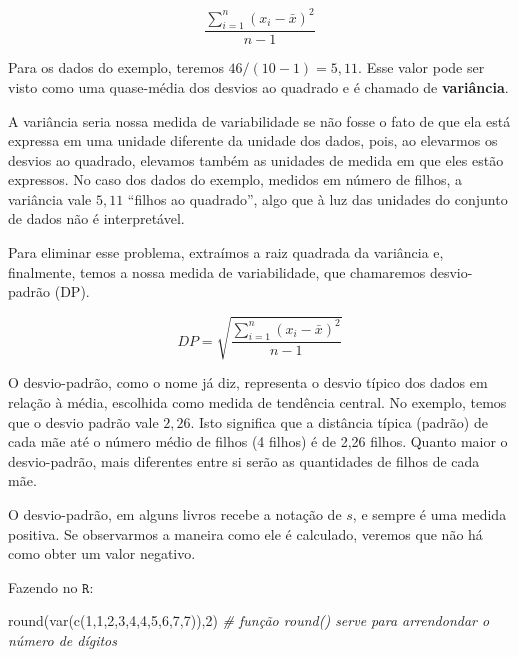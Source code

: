 \documentclass[
]{book}
\newenvironment{Shaded}{\begin{snugshade}}{\end{snugshade}}
\newcommand{\CommentTok}[1]{\textcolor[rgb]{0.56,0.35,0.01}{\textit{#1}}}
\newcommand{\DecValTok}[1]{\textcolor[rgb]{0.00,0.00,0.81}{#1}}
\newcommand{\FunctionTok}[1]{\textcolor[rgb]{0.00,0.00,0.00}{#1}}
\newcommand{\NormalTok}[1]{#1}
\begin{document}
\begin{equation*}
\frac{\sum_{i=1}^n (x_i-\bar x)^2}{n-1}
\end{equation*}

Para os dados do exemplo, teremos \(46/(10-1)=5,11\). Esse valor pode ser visto como uma quase-média dos desvios ao quadrado e é chamado de \textbf{variância}.

A variância seria nossa medida de variabilidade se não fosse o fato de que ela está expressa em uma unidade diferente da unidade dos dados, pois, ao elevarmos os desvios ao quadrado, elevamos também as unidades de medida em que eles estão expressos. No caso dos dados do exemplo, medidos em número de filhos, a variância vale \(5,11\) ``filhos ao quadrado'', algo que à luz das unidades do conjunto de dados não é interpretável.

Para eliminar esse problema, extraímos a raiz quadrada da variância e, finalmente, temos a nossa medida de variabilidade, que chamaremos desvio-padrão (DP).

\begin{equation*}
DP=\sqrt{\frac{\sum_{i=1}^n (x_i-\bar x)^2}{n-1}}
\end{equation*}

O desvio-padrão, como o nome já diz, representa o desvio típico dos dados em relação à média, escolhida como medida de tendência central. No exemplo, temos que o desvio padrão vale \(2,26\). Isto significa que a distância típica (padrão) de cada mãe até o número médio de filhos (4 filhos) é de 2,26 filhos. Quanto maior o desvio-padrão, mais diferentes entre si serão as quantidades de filhos de cada mãe.

O desvio-padrão, em alguns livros recebe a notação de \(s\), e sempre é uma medida positiva. Se observarmos a maneira como ele é calculado, veremos que não há como obter um valor negativo.

Fazendo no \(\texttt{R}\):

\begin{Shaded}
\begin{Highlighting}[]
\FunctionTok{round}\NormalTok{(}\FunctionTok{var}\NormalTok{(}\FunctionTok{c}\NormalTok{(}\DecValTok{1}\NormalTok{,}\DecValTok{1}\NormalTok{,}\DecValTok{2}\NormalTok{,}\DecValTok{3}\NormalTok{,}\DecValTok{4}\NormalTok{,}\DecValTok{4}\NormalTok{,}\DecValTok{5}\NormalTok{,}\DecValTok{6}\NormalTok{,}\DecValTok{7}\NormalTok{,}\DecValTok{7}\NormalTok{)),}\DecValTok{2}\NormalTok{) }\CommentTok{\# função round() serve para arrendondar o número de dígitos}
\end{Highlighting}
\end{Shaded}
\end{document}
